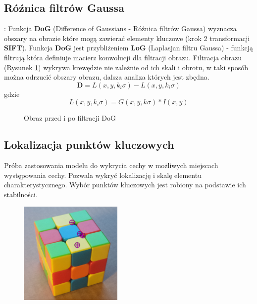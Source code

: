 \subsection{Róźnica filtrów Gaussa}:
   Funkcja \textbf{DoG} (Difference of Gaussians - Róźnica filtrów Gaussa) wyznacza obszary na obrazie które mogą zawierać elementy kluczowe (krok 2 transformacji \textbf{SIFT}). Funkcja \textbf{DoG} jest przybliżeniem \textbf{LoG} (Laplasjan filtru Gaussa) - funkcją filtrują która definiuje macierz konwolucji dla filtracji obrazu. Filtracja obrazu (Rysunek \ref{fig:DoG})  wykrywa krewędzie nie zależnie od ich skali i obrotu, w taki sposób można odrzucić obszary obrazu, dalsza analiza których jest zbędna.
   \begin{equation} \label{eq:DoG}
      \mathbf{D} = L(x, y, k_i \sigma) - L(x, y, k_i \sigma)
   \end{equation}
   gdzie
   \begin{equation} \label{eq:DoG}
      L(x, y, k_i \sigma) = G(x, y, k\sigma) * I(x, y)
   \end{equation}

   \begin{figure}[h]
      \centering
      \smallskip{ }
      \smallskip{ }
   \caption{Obraz przed i po filtracji DoG}
   \label {fig:DoG}
   \end{figure}



\subsection{Lokalizacja punktów kluczowych}
      Próba zastosowania modelu do wykrycia cechy w możliwych miejscach występowania cechy. Pozwala wykryć lokalizację i skalę elementu charakterystycznego. Wybór punktów kluczowych jest robiony na podstawie ich stabilności.

      \begin{figure}[h]
         \centering
         \includegraphics[width=5cm]{SIFT_cube_points.png}
         \label {fig:SIFT_points}
      \end{figure}

